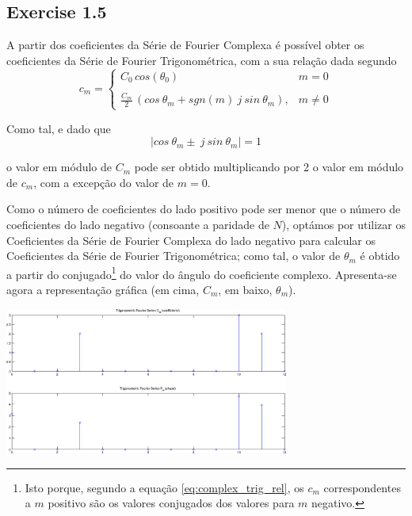 \documentclass[a4paper]{article}
\begin{document}
\subsection{Exercise 1.5}
\label{subsec:ex_1_5}
\noindent A partir dos coeficientes da Série de Fourier Complexa é possível obter os coeficientes da Série de Fourier Trigonométrica, com a sua relação dada segundo
\begin{equation}
	c_m = \left\{
	\begin{array}{lr}
		C_0 \, cos(\theta_0) & m = 0 \\
		\, & \, \\
		\frac{C_m}{2} \, (cos~\theta_m + sgn(m)~j~sin~\theta_m), & m \neq 0
	\end{array}
	\right.
	\label{eq:complex_trig_rel}
\end{equation}

\noindent Como tal, e dado que
\begin{equation}
	|cos~\theta_m \pm~j~sin~\theta_m| = 1
\end{equation}

\noindent o valor em módulo de $C_m$ pode ser obtido multiplicando por 2 o valor em módulo de $c_m$, com a excepção do valor de $m = 0$.

\clearpage

\noindent Como o número de coeficientes do lado positivo pode ser menor que o número de coeficientes do lado negativo (consoante a paridade de $N$), optámos por utilizar os Coeficientes da Série de Fourier Complexa do lado negativo para calcular os Coeficientes da Série de Fourier Trigonométrica; como tal, o valor de $\theta_m$ é obtido a partir do conjugado\footnote{Isto porque, segundo a equação \ref{eq:complex_trig_rel}, os $c_m$ correspondentes a $m$ positivo são os valores conjugados dos valores para $m$ negativo.} do valor do ângulo do coeficiente complexo. Apresenta-se agora a representação gráfica (em cima, $C_m$, em baixo, $\theta_m$).
\begin{center}
	\includegraphics[width=0.70\textwidth]{images/ex_1_5.png}
	\label{fig:ex_1_5}
\end{center}
\end{document}
